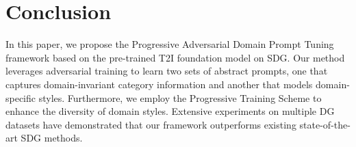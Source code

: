 \section{Conclusion} 
In this paper, we propose the Progressive Adversarial Domain Prompt Tuning framework based on the pre-trained T2I foundation model on SDG. 
Our method leverages adversarial training to learn two sets of abstract prompts, one that captures domain-invariant category information and another that models domain-specific styles.
Furthermore, we employ the Progressive Training Scheme to enhance the diversity of domain styles.
Extensive experiments on multiple DG datasets have demonstrated that our framework outperforms existing state-of-the-art SDG methods.